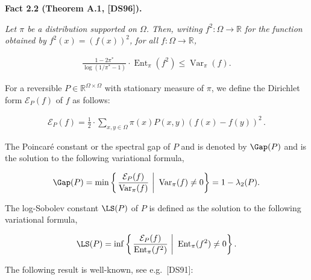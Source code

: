 

\par\medskip\noindent\textbf{\textbf{Fact 2.2}\textbf{ }(Theorem A.1, [DS96])\textbf{.}}\par



\emph{Let $\pi$ be a distribution supported on $\Omega$. Then, writing $f^{2}:\Omega\to\mathbb{R}$ for the function obtained by $f^{2}(x)=(f(x))^{2}$, for all $f:\Omega\to\mathbb{R}$,}\par


\[\begin{gathered}
\frac{1-2\pi^{*}}{\log(1/\pi^{*}-1)}\cdot\operatorname{Ent}_{\pi}(f^{2})\leq\operatorname{Var}_{\pi}(f).
\end{gathered}\]






For a reversible $P\in\mathbb{R}^{\Omega\times\Omega}$ with
stationary measure of $\pi$, we define the Dirichlet form $\mathcal{E}_{P}(f)$ of $f$ as follows:\par


\[\begin{gathered}
\mathcal{E}_{P}(f)=\frac{1}{2}\cdot\sum_{x,y\in\Omega}\pi(x)P(x,y)(f(x)-f(y))^{2}\,.
\end{gathered}\]




The Poincaré constant or the spectral gap of $P$ and
is denoted by $\Gap(P)$ and is the solution to the following variational formula,\par


\[\begin{gathered}
\Gap(P)=\min\left\{\left.\frac{\mathcal{E}_{P}(f)}{\operatorname{Var}_{\pi}(f)}~\right|~\operatorname{Var}_{\pi}(f)\neq 0\right\}=1-\lambda_{2}(P).
\end{gathered}\]


The log-Sobolev constant $\LS(P)$ of $P$ is defined as the solution to the following variational formula,\par


\[\begin{gathered}
\LS(P)=\inf\left\{\left.\frac{\mathcal{E}_{P}(f)}{\operatorname{Ent}_{\pi}(f^{2})}~\right|~\operatorname{Ent}_{\pi}(f^{2})\neq 0\right\}.
\end{gathered}\]


The following result is well-known, see e.g. [DS91]:\par



